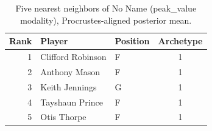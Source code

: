 \begin{table}[htbp]
  \centering\small
  \begin{tabular}{rllc}
    \toprule
    Rank & Player & Position & Archetype \\
    \midrule
    1 & Clifford Robinson & F & 1 \\
    2 & Anthony Mason & F & 1 \\
    3 & Keith Jennings & G & 1 \\
    4 & Tayshaun Prince & F & 1 \\
    5 & Otis Thorpe & F & 1 \\
    \bottomrule
  \end{tabular}
  \caption{Five nearest neighbors of No Name (peak_value modality), Procrustes-aligned posterior mean.}
  \label{tab:No_Name_neighbors_peak_value}
\end{table}

